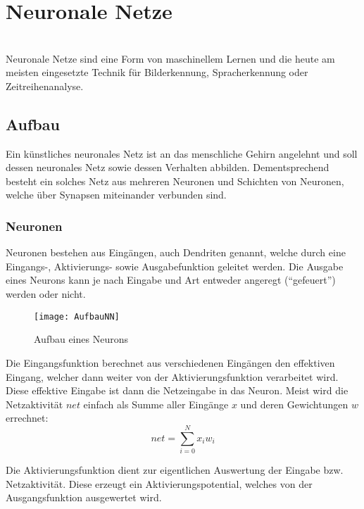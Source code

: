     \section{Neuronale Netze}
    \cite[Vgl. im Folgenden]{EinfuehrunginNN,WissensbasierteSysteme}\\
    Neuronale Netze sind eine Form von maschinellem Lernen und die heute am meisten eingesetzte Technik für Bilderkennung, Spracherkennung oder Zeitreihenanalyse.
    
    \subsection*{Aufbau}
    Ein künstliches neuronales Netz ist an das menschliche Gehirn angelehnt und soll dessen neuronales Netz sowie dessen Verhalten abbilden. 
    Dementsprechend besteht ein solches Netz aus mehreren Neuronen und Schichten von Neuronen, welche über Synapsen miteinander verbunden sind.


    \subsubsection{Neuronen}
    Neuronen bestehen aus Eingängen, auch Dendriten genannt, welche durch eine Eingangs-, Aktivierungs- sowie Ausgabefunktion geleitet werden.
    Die Ausgabe eines Neurons kann je nach Eingabe und Art entweder angeregt ("`gefeuert"') werden oder nicht.
    
    \begin{figure}[H]
        \centering
        \texttt{[image: AufbauNN]}
        \caption{Aufbau eines Neurons}
        \label{fig:AufbauNN}
    \end{figure}
    
    \noindent
    Die Eingangsfunktion berechnet aus verschiedenen Eingängen den effektiven Eingang, welcher dann weiter von der Aktivierungsfunktion verarbeitet wird.
    Diese effektive Eingabe ist dann die Netzeingabe in das Neuron.
    Meist wird die Netzaktivität \(net\) einfach als Summe aller Eingänge \(x\) und deren Gewichtungen \(w\) errechnet:
    \begin{equation}
        net = \sum_{i=0}^N x_i w_i
    \end{equation}
    \newline

    \noindent
    Die Aktivierungsfunktion dient zur eigentlichen Auswertung der Eingabe bzw. Netzaktivität.
    Diese erzeugt ein Aktivierungspotential, welches von der Ausgangsfunktion ausgewertet wird.
    \newline
    

